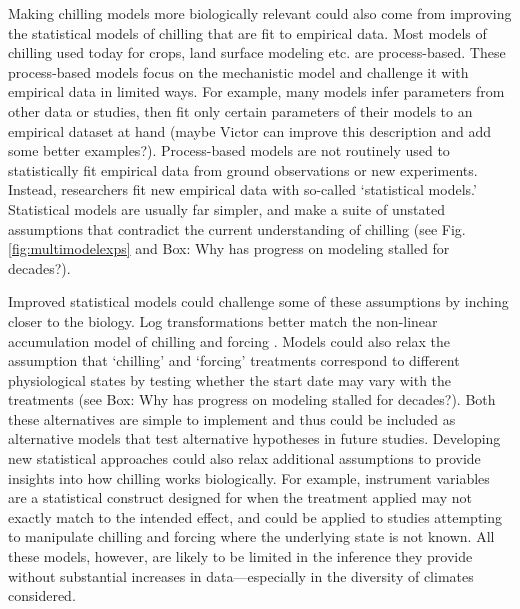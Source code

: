 \documentclass[11pt]{article}
\begin{document}
Making chilling models more biologically relevant could also come from improving the statistical models of chilling that are fit to empirical data. Most models of chilling used today for crops, land surface modeling etc. are process-based. These process-based models focus on the mechanistic model and challenge it with empirical data in limited ways. For example, many models infer parameters from other data or studies, then fit only certain parameters of their models to an empirical dataset at hand \citep{richardson1974} (maybe Victor can improve this description and add some better examples?). Process-based models are not routinely used to statistically fit empirical data from ground observations or new experiments. %
Instead, researchers fit new empirical data with so-called `statistical models.' Statistical models are usually far simpler, and make a suite of unstated assumptions that contradict the current understanding of chilling 
(see Fig.\ref{fig:multimodelexps} and Box: Why has progress on modeling stalled for decades?). %

Improved statistical models could challenge some of these assumptions by inching closer to the biology. Log transformations better match the non-linear accumulation model of chilling and forcing \citep{decsens}. Models could also relax the assumption that  `chilling' and `forcing' treatments correspond to different physiological states by testing whether the start date may vary with the treatments (see Box: Why has progress on modeling stalled for decades?). Both these alternatives are simple to implement and thus could be included as alternative models that test alternative hypotheses in future studies. 
Developing new statistical approaches could also relax additional assumptions to provide insights into how chilling works biologically. For example, instrument variables are a statistical construct designed for when the treatment applied may not exactly match to the intended effect, and could be applied to studies attempting to manipulate chilling and forcing where the underlying state is not known. All these models, however, are likely to be limited in the inference they provide without substantial increases in data---especially in the diversity of climates considered. 
\end{document}
